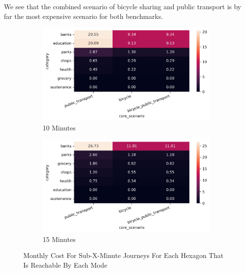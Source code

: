 We see that the combined scenario of bicycle sharing and public transport is by far the most expensive scenario for both benchmarks.




\begin{figure}
  \centering
  \begin{subfigure}[b]{0.45\textwidth}
    \centering
    \includegraphics[width=\textwidth]{Figures/results/monthly_costs/cost_all_reachable_in_10.png}
    \caption{10 Minutes}
    \label{fig:costs_all_reachable_10}
  \end{subfigure}
  \hfill
  \begin{subfigure}[b]{0.45\textwidth}
    \centering
    \includegraphics[width=\textwidth]{Figures/results/monthly_costs/cost_all_reachable_in_15.png}
    \caption{15 Minutes}
    \label{fig:costs_all_reachable_15}
  \end{subfigure}
  \caption{Monthly Cost For Sub-X-Minute Journeys For Each Hexagon That Is Reachable By Each Mode}
  \label{fig:costs_all_reachable_x}
\end{figure}
